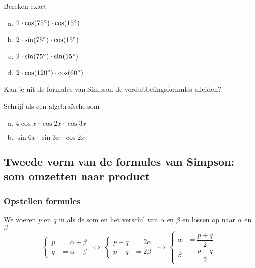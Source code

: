 \documentclass[twoside,a4paper,12pt]{article}
\begin{document}
\begin{oefening}
Bereken exact
\begin{enumerate}[(a)]
\itemsep.5em
  \item $2\cdot \cos(75^\circ)\cdot \cos(15^\circ)$
  \item $2\cdot \sin(75^\circ)\cdot \cos(15^\circ)$
  \item $2\cdot \sin(75^\circ)\cdot \sin(15^\circ)$
  \item $2\cdot \cos(120^\circ)\cdot \cos(60^\circ)$
\end{enumerate}
\end{oefening}

\begin{oefening}
Kan je uit de formules van Simpson de verdubbelingsformules afleiden?
\end{oefening}

\begin{oefening}
Schrijf als een algebraïsche som
\begin{enumerate}[(a)]
\itemsep.5em
  \item $4 \cos x \cdot \cos 2x \cdot \cos 3x$
  \item $\sin 6x \cdot \sin 3x \cdot \cos 2x$
\end{enumerate}
\end{oefening}

\subsection{Tweede vorm van de formules van Simpson: som omzetten naar product}

\subsubsection*{Opstellen formules}

We voeren $p$ en $q$ in als de som en het verschil van $\alpha$ en $\beta$ en lossen op naar $\alpha$ en $\beta$
$$
  \left\{\begin{aligned}p&=\alpha+\beta\\q&=\alpha-\beta\end{aligned}\right.
  \;\Leftrightarrow\; \left\{\begin{aligned}p+q&=2\alpha\\p-q&=2\beta\end{aligned}\right.
  \;\Leftrightarrow\; \left\{\begin{aligned}\alpha&=\dfrac{p+q}{2}\\\beta&=\dfrac{p-q}{2}\end{aligned}\right.
$$
\end{document}
